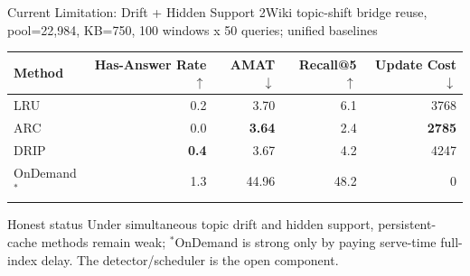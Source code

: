 \documentclass[aspectratio=169,10pt]{beamer}
\newcommand{\en}[1]{{\latinfont #1}}
\newcommand{\dive}{\en{DRIP}}
\newcommand{\arc}{\en{ARC}}
\newcommand{\lru}{\en{LRU}}
\newcommand{\ond}{\en{OnDemand}}
\begin{document}
\begin{frame}{Current Limitation: Drift + Hidden Support}
  \scriptsize
  \en{2Wiki topic-shift bridge reuse, pool=22,984, KB=750, 100 windows x 50 queries; unified baselines}

  \begin{table}
  \centering
  \renewcommand{\arraystretch}{1.08}
  \setlength{\tabcolsep}{5.0pt}
  \begin{tabular}{lrrrr}
    \toprule
    Method & \shortstack{\en{Has-Answer}\\\en{Rate}$\uparrow$} & \en{AMAT}$\downarrow$ & \en{Recall@5}$\uparrow$ & \shortstack{\en{Update}\\\en{Cost}$\downarrow$} \\
    \midrule
    \lru{} & 0.2 & 3.70 & 6.1 & 3768 \\
    \arc{} & 0.0 & \textbf{3.64} & 2.4 & \textbf{2785} \\
    \dive{} & \textbf{0.4} & 3.67 & 4.2 & 4247 \\
    \ond{}$^*$ & 1.3 & 44.96 & 48.2 & 0 \\
    \bottomrule
  \end{tabular}
  \end{table}

  \begin{alertblock}{Honest status}
    Under simultaneous topic drift and hidden support, persistent-cache methods
    remain weak; $^*$\ond{} is strong only by paying serve-time full-index delay.
    The detector/scheduler is the open component.
  \end{alertblock}
\end{frame}
\end{document}
